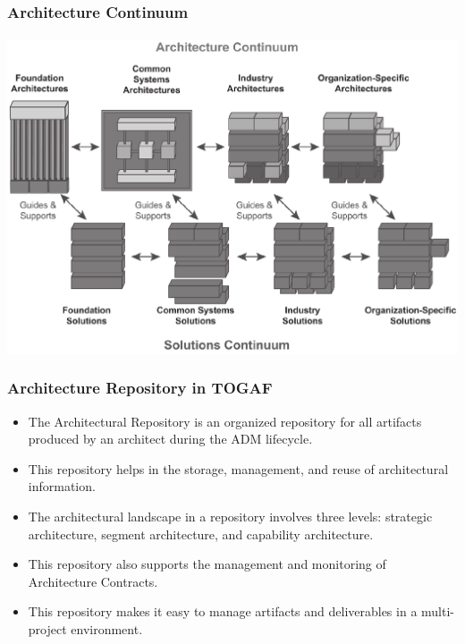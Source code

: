\documentclass[aspectratio=169, table]{beamer}
\begin{document}
    {
        \begin{frame}
            \frametitle{Architecture Continuum}
            \framesubtitle{\hspace{1cm}}
            \begin{center}
                \includegraphics[width=.80\textwidth]{../figures/enterprise_continuum}
            \end{center}
        \end{frame}
    }

    \begin{frame}
        \frametitle{Architecture Repository in TOGAF}
        \vspace{20pt}
        \begin{itemize}
            \item The Architectural Repository is an organized repository for all artifacts produced by an architect during the ADM lifecycle.
            \item This repository helps in the storage, management, and reuse of architectural information.
            \item The architectural landscape in a repository involves three levels: strategic architecture, segment architecture, and capability architecture.
            \item This repository also supports the management and monitoring of Architecture Contracts.
            \item This repository makes it easy to manage artifacts and deliverables in a multi-project environment.
        \end{itemize}
    \end{frame}
\end{document}
